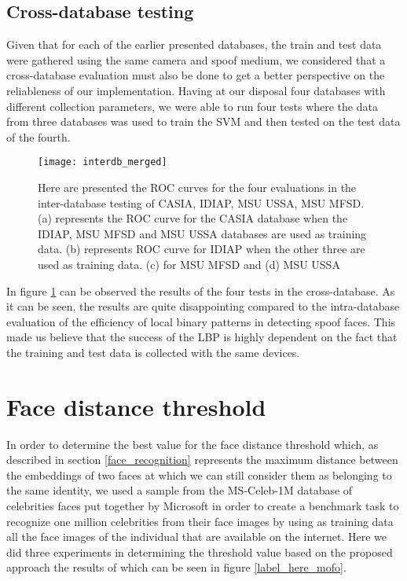 \subsection{Cross-database testing}
Given that for each of the earlier presented databases, the train and test data were gathered using the same camera and spoof medium, we considered that a cross-database evaluation must also be done to get a better perspective on the reliableness of our implementation. Having at our disposal four databases with different collection parameters, we were able to run four tests where the data from three databases was used to train the SVM and then tested on the test data of the fourth. 
\begin{figure}[H]
	\captionsetup{width=15cm,font=small}
	\begin{center}
		\texttt{[image: interdb\_merged]}
	\end{center}
	\caption[Cross-database face spoof classification results]{Here are presented the ROC curves for the four evaluations in the inter-database testing of CASIA, IDIAP, MSU USSA, MSU MFSD. (a) represents the ROC curve for the CASIA database when the IDIAP, MSU MFSD and MSU USSA databases are used as training data. (b) represents ROC curve for IDIAP when the other three are used as training data. (c) for MSU MFSD and (d) MSU USSA}
	\label{fig:interdb_results}
\end{figure}
In figure \ref{fig:interdb_results} can be observed the results of the four tests in the cross-database. As it can be seen, the results are quite disappointing compared to the intra-database evaluation of the efficiency of local binary patterns in detecting spoof faces. This made us believe that the success of the LBP is highly dependent on the fact that the training and test data is collected with the same devices.

\section{Face distance threshold}
In order to determine the best value for the face distance threshold which, as described in section \ref{face_recognition} represents the maximum distance between the embeddings of two faces at which we can still consider them as belonging to the same identity, we used a sample from the MS-Celeb-1M database of celebrities faces put together by Microsoft in order to create a benchmark task to recognize one million celebrities from their face images by using as training data all the face images of the individual that are available on the internet. Here we did three experiments in determining the threshold value based on the proposed approach the results of which can be seen in figure \ref{label_here_mofo}. 

